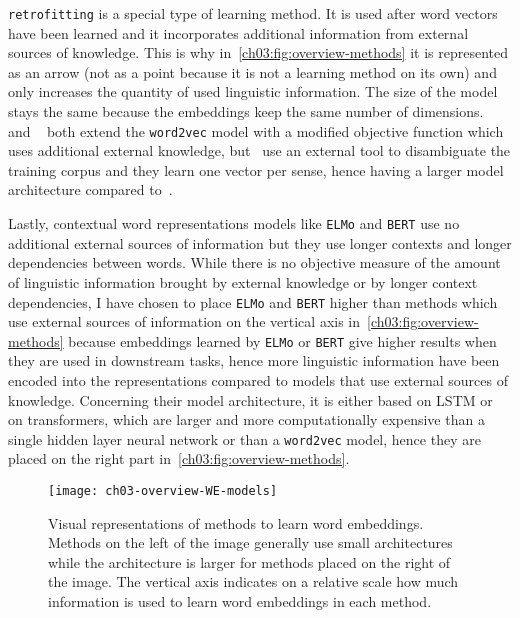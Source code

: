     \texttt{retrofitting} is a special type of learning method. It is used after
    word vectors have been learned and it incorporates additional information
    from external sources of knowledge. This is why
    in~\autoref{ch03:fig:overview-methods} it is represented as an arrow (not as
    a point because it is not a learning method on its own) and only increases
    the quantity of used linguistic information. The size of the model stays the
    same because the embeddings keep the same number of dimensions.
    \citeauthor{yudredze2014improving}~\citep{yudredze2014improving} and
    \citeauthor{iacobacci2015sensembed}~\citep{iacobacci2015sensembed} both
    extend the \texttt{word2vec} model with a modified objective function which
    uses additional external knowledge, but~\citeauthor{iacobacci2015sensembed}
    use an external tool to disambiguate the training corpus and they learn one
    vector per sense, hence having a larger model architecture compared
    to~\citet{yudredze2014improving}. \medskip

    Lastly, contextual word representations models like \texttt{ELMo} and
    \texttt{BERT} use no additional external sources of information but they use
    longer contexts and longer dependencies between words. While there is no
    objective measure of the amount of linguistic information brought by
    external knowledge or by longer context dependencies, I have chosen to place
    \texttt{ELMo} and \texttt{BERT} higher than methods which use external
    sources of information on the vertical axis
    in~\autoref{ch03:fig:overview-methods} because embeddings learned by
    \texttt{ELMo} or \texttt{BERT} give higher results when they are used in
    downstream tasks, hence more linguistic information have been encoded into
    the representations compared to models that use external sources of
    knowledge. Concerning their model architecture, it is either based on LSTM
    or on transformers, which are larger and more computationally expensive than
    a single hidden layer neural network or than a \texttt{word2vec} model,
    hence they are placed on the right part
    in~\autoref{ch03:fig:overview-methods}.

    \begin{figure}[h]
      \centering
      \texttt{[image: ch03-overview-WE-models]}
      \caption[Visual representations of methods to learn word embeddings.]
      {Visual representations of methods to learn word embeddings. Methods on
      the left of the image generally use small architectures while the
      architecture is larger for methods placed on the right of the image. The
      vertical axis indicates on a relative scale how much information is used
      to learn word embeddings in each method.}
      \label{ch03:fig:overview-methods}
    \end{figure}

